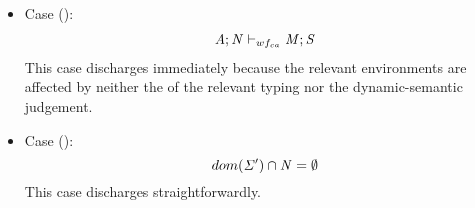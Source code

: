 \begin{nproof}
\begin{bcase}
\begin{itemize}
\begin{itemize}
      \item Case ():
      \begin{align*}
      \mathit{A};\mathit{N} \vdash_{wf_{ca}} \mathit{M};\mathit{S}
      \end{align*}
      This case discharges immediately because the relevant environments
      are affected by neither the of the relevant typing nor the dynamic-semantic judgement.
      \item
      Case ():
      \begin{displaymath}
      dom(\mathit{\Sigma}') \cap \mathit{N} = \emptyset
      \end{displaymath}
      This case discharges straightforwardly.
      \end{itemize}
    \end{itemize}
  \end{bcase}


\end{nproof}
